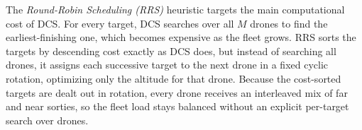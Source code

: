 \documentclass[subscriptcorrection,upint,nolists, varvw,barcolor=Goldenrod3,mathalfa=cal=euler,balance,hyphenate,french]{asmejour} %
\begin{document}


The \emph{Round-Robin Scheduling (RRS)} heuristic targets the main computational cost of DCS. For every target, DCS searches over all $M$ drones to find the earliest-finishing one, which becomes expensive as the fleet grows. RRS sorts the targets by descending cost exactly as DCS does, but instead of searching all drones, it assigns each successive target to the next drone in a fixed cyclic rotation, optimizing only the altitude for that drone. Because the cost-sorted targets are dealt out in rotation, every drone receives an interleaved mix of far and near sorties, so the fleet load stays balanced without an explicit per-target search over drones.
\end{document}
